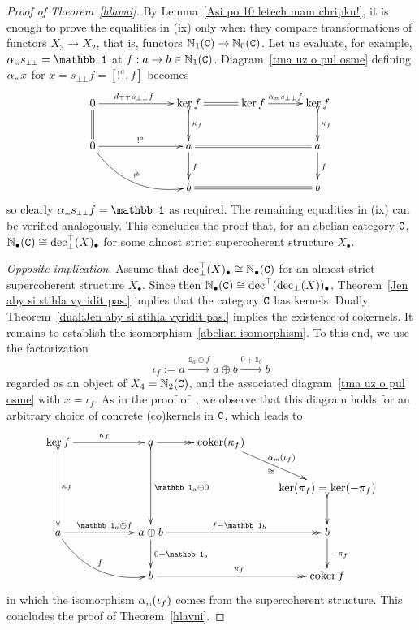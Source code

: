 \documentclass[12pt,leqno]{amsart}
\theoremstyle{definition}
\def\udec{{\rm dec}^{\top}}
\def\ldec{{\rm dec}_{\bot}}
\def\uldec{{\rm dec}_{\bot}^{\top}}
\def\id{{\mathbb 1}}
\def\amix{\alpha_{\scriptscriptstyle{\it{m}}}}
\def\dttop{d_{\scriptscriptstyle{\top\top}}}
\def\dttop{d_{\scriptscriptstyle{\top\top}}}
\def\sbbot{s_{\scriptscriptstyle\bot\bot}}
\newcommand{\C}{{\tt C}}
\newcommand{\NN}{\mathbb{N}}
\newcommand{\4}{\texttt{4}}
\DeclareMathOperator{\coker}{coker}
\begin{document}
\begin{proof}[Proof of Theorem~\ref{hlavni}]
By Lemma~\ref{Asi po 10 letech mam chripku!}, it is enough 
to prove the equalities in (ix)
only when they compare transformations of functors $X_3 \to X_2$, that
is, functors $\NN_1(\C) \to \NN_0(\C)$. Let us evaluate, for example, $
\amix\sbbot=\id$ at $f : a \to b  \in \NN_1(\C)$.
Diagram~\eqref{tma uz o pul osme} defining
$\amix x$ for $x = \sbbot f=[!^a,f]$ becomes
\[
\xymatrix@C=3em{
0 \ar[rr]^(.43){\dttop \sbbot f} \ar@{=}[d] 
&& \ker f \ar@{=}[r]  \ar@{>->}[d]^{\kappa_f} 
& \ker f  \ar@{->}[r]^{\amix\sbbot f}
& \ker f \ar@{>->}[d]^{\kappa_f}
\\
0 \ar@/_1.5em/[rrd]^{!^b} 
\ar[rr]^{!^a} &&a \ar[d]^f \ar@{=}[rr] && a \ar[d]^{f} 
\\
&& b\ar@{=}[rr] &&  b
}
\]
so clearly $\amix\sbbot f = \id$ as required.
The remaining equalities in (ix) can be verified analogously. This
concludes the proof that, for an abelian category $\C$,
$\NN_\bullet(\C) \cong \uldec (X)_\bullet$ for some almost strict supercoherent structure  $X_\bullet$.

\noindent\textit{Opposite implication.}
Assume that $\uldec(X)_\bullet\cong\NN_\bullet(\C)$ for an almost
strict supercoherent structure $X_\bullet$. Since then
$\NN_\bullet(\C) \cong\udec(\ldec (X))_\bullet$, Theorem~\ref{Jen aby si stihla
  vyridit pas.} implies that 
the category $\C$ has kernels. Dually, 
Theorem~\ref{dual:Jen aby si stihla vyridit pas.} implies the
existence of cokernels. It remains to establish the
isomorphism~\eqref{abelian isomorphism}.
To this end, we use the factorization  
\begin{equation}
\label{Zitra mi zacinaji prijizdet ucastnici.}
\iota_f := a \xrightarrow {\id_a \oplus f} a \oplus b
\xrightarrow{0+\id_b} b
\end{equation}
regarded as an object of $X_4 = \NN_2(\C)$, and the associated
diagram~\eqref{tma uz o pul osme} with $x = \iota_f$. As in 
the proof of~\cite[Theorem~24]{abelian}, we observe that this diagram
holds for an arbitrary choice of concrete (co)kernels in $\C$, which
leads to
\[
\xymatrix{\ker f  \ar[rr]^{\kappa_f} \ar@{>->}[dd]^{\kappa_{f}} 
&& a\ar@{->>}[r]  \ar@{>->}[dd]^{\id_a \oplus 0}
& \coker (\kappa_f) \ar@{->}[dr]^{\amix(\iota_f)}_\cong
\\
&&&& \ker  (\pi_f) = \ker  (-\pi_f) \ar@{>->}[d]
\\
a \ar@/_1.5em/[rrd]^{f} \ar[rr]^{\id_a \oplus f} && a\oplus b 
\ar[d]^{0 + \id_b} \ar@{->>}[rr]^{f- \id_b} && b \ar[d]^{-\pi_f} 
\\
&& b\ar@{->>}[rr]^{\pi_{f}} &&  \coker f 
}
\]
in which the isomorphism $\amix(\iota_f)$ comes from the
supercoherent structure. This concludes the proof of Theorem~\ref{hlavni}.
\end{proof}
\end{document}
